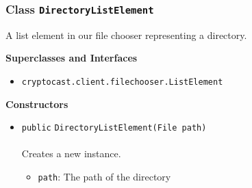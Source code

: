 \subsubsection{Class \lstinline|DirectoryListElement|}
A list element in our file chooser representing a directory. \\
\noindent\begin{minipage}[t]{5cm}
\vspace{0.3em}
\hspace*{2em}
\vspace{0.3em}
\end{minipage}



\textbf{\sffamily Superclasses and Interfaces}
\begin{itemize}
\item \lstinline|cryptocast.client.filechooser.ListElement|
\end{itemize}


\textbf{\sffamily Constructors}
\begin{itemize}
\item \lstinline|public| \lstinline|DirectoryListElement|\lstinline|(File path)|\\ \\[-0.6em]
Creates a new instance.
\begin{itemize}
\item \lstinline|path|: The path of the directory
\end{itemize}



\end{itemize}


